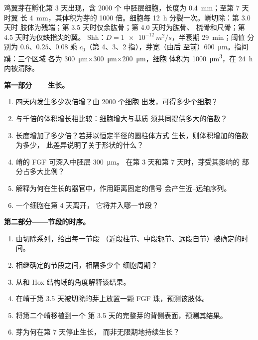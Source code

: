 \begin{problem}
\label{pb:b2:limb-organogenesis:1}
鸡翼芽在孵化第 3 天出现，含 \num{2000} 个
中胚层细胞，长度为 \qty{0.4}{mm}；至第 7 天时翼
长 \qty{4}{mm}，其体积为芽的 \num{1000} 倍。细胞每 \qty{12}{h} 分裂一次。嵴切除：第 3.0 天时
肢体为残端；第 3.5 天时仅余肱骨；第 4.0 天时为肱骨、
桡骨和尺骨；第 4.5 天时为仅缺指尖的翼。
Shh：$D = \qty{1e-12}{m^2/s}$，半衰期 \qty{29}{min}；阈值
分别为 $0.6$、$0.25$、$0.08$ 乘 $c_0$（第 4、3、2 指），芽宽（由后
至前）\qty{600}{\micro m}。指间蹼：三个区域
各为 \qty{300}{\micro m}$\times$\qty{300}{\micro m}$\times$\qty{200}{\micro m}，细胞
体积为 \qty{1000}{\micro m^3}，在 \qty{24}{h} 内被清除。

\medskip
\noindent\textbf{第一部分——生长。}
\begin{enumerate}
  \item 四天内发生多少次倍增？由 \num{2000} 个细胞
        出发，可得多少个细胞？
  \item 与千倍的体积增长相比较：细胞增大与基质
        须共同提供多大的倍数？
  \item 长度增加了多少倍？若芽以恒定半径的圆柱体方式
        生长，则体积增加的倍数为多少，
        此差异说明了关于形状的什么？
  \item 嵴的 FGF 可深入中胚层 \qty{300}{\micro m}。
        在第 3 天和第 7 天时，芽受其影响的
        部分占多大比例？
  \item 解释为何在生长的器官中，作用距离固定的信号
        会产生近–远轴序列。
  \item 一个细胞在第 4 天离开，
        它将并入哪一节段？
\end{enumerate}

\medskip
\noindent\textbf{第二部分——节段的时序。}
\begin{enumerate}[resume]
  \item 由切除系列，给出每一节段
        （近段柱节、中段轭节、远段自节）被确定的时间。
  \item 相继确定的节段之间，相隔多少个
        细胞周期？
  \item 从和
        Hox 结构域的角度解释该结果。
  \item 在嵴于第 3.5
        天被切除的芽上放置一颗 FGF 珠，预测该肢体。
  \item 将第二个嵴移植到一个
        第 3.5 天的完整芽的背侧表面，预测其结果。
  \item 芽为何在第 7 天停止生长，
        而非无限期地持续生长？
\end{enumerate}


\end{problem}
